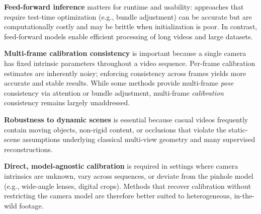 \textbf{Feed-forward inference} matters for runtime and usability: approaches that require test-time optimization (e.g., bundle adjustment) can be accurate but are computationally costly and may be brittle when initialization is poor. In contrast, feed-forward models enable efficient processing of long videos and large datasets.

\textbf{Multi-frame calibration consistency} is important because a single camera has fixed intrinsic parameters throughout a video sequence. Per-frame calibration estimates are inherently noisy; enforcing consistency across frames yields more accurate and stable results. While some methods provide multi-frame \emph{pose} consistency via attention or bundle adjustment, multi-frame \emph{calibration} consistency remains largely unaddressed.

\textbf{Robustness to dynamic scenes} is essential because casual videos frequently contain moving objects, non-rigid content, or occlusions that violate the static-scene assumptions underlying classical multi-view geometry and many supervised reconstructions.

\textbf{Direct, model-agnostic calibration} is required in settings where camera intrinsics are unknown, vary across sequences, or deviate from the pinhole model (e.g., wide-angle lenses, digital crops). Methods that recover calibration without restricting the camera model are therefore better suited to heterogeneous, in-the-wild footage.

